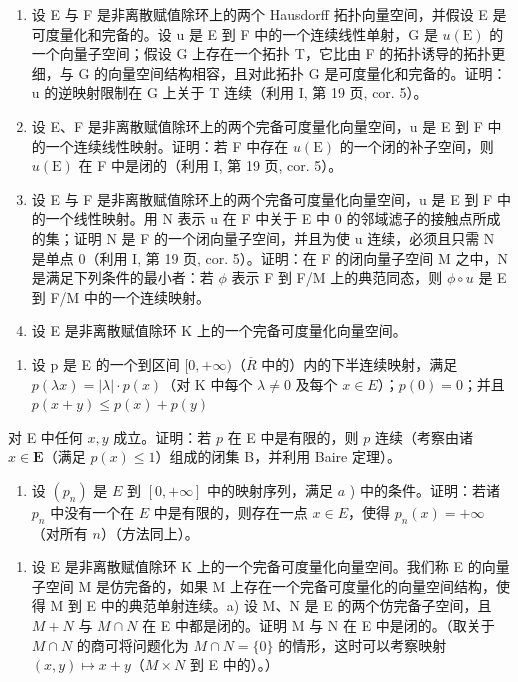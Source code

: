 \begin{enumerate}
\def\labelenumi{\arabic{enumi})}
\setcounter{enumi}{2}
\item
  设 E 与 F 是非离散赋值除环上的两个 Hausdorff 拓扑向量空间，并假设 E 是可度量化和完备的。设 u 是 E 到 F 中的一个连续线性单射，G 是 \(u(\mathrm{E})\) 的一个向量子空间；假设 G 上存在一个拓扑 T，它比由 F 的拓扑诱导的拓扑更细，与 G 的向量空间结构相容，且对此拓扑 G 是可度量化和完备的。证明：u 的逆映射限制在 G 上关于 T 连续（利用 I, 第 19 页, cor. 5）。
\item
  设 E、F 是非离散赋值除环上的两个完备可度量化向量空间，u 是 E 到 F 中的一个连续线性映射。证明：若 F 中存在 \(u(\mathrm{E})\) 的一个闭的补子空间，则 \(u(\mathrm{E})\) 在 F 中是闭的（利用 I, 第 19 页, cor. 5）。
\item
  设 E 与 F 是非离散赋值除环上的两个完备可度量化向量空间，u 是 E 到 F 中的一个线性映射。用 N 表示 u 在 F 中关于 E 中 0 的邻域滤子的接触点所成的集；证明 N 是 F 的一个闭向量子空间，并且为使 u 连续，必须且只需 N 是单点 0（利用 I, 第 19 页, cor. 5）。证明：在 F 的闭向量子空间 M 之中，N 是满足下列条件的最小者：若 \(\phi\) 表示 F 到 F/M 上的典范同态，则 \(\phi \circ u\) 是 E 到 F/M 中的一个连续映射。
\item
  设 E 是非离散赋值除环 K 上的一个完备可度量化向量空间。
\end{enumerate}

\begin{enumerate}
\def\labelenumi{\alph{enumi})}
\tightlist
\item
  设 p 是 E 的一个到区间 \([0, +\infty)\)（\(\overline{R}\) 中的）内的下半连续映射，满足 \(p(\lambda x) = |\lambda| \cdot p(x)\)（对 K 中每个 \(\lambda \neq 0\) 及每个 \(x \in E\)）；\(p(0) = 0\)；并且 \(p(x + y) \leqslant p(x) + p(y)\)
\end{enumerate}

对 E 中任何 \(x, y\) 成立。证明：若 \(p\) 在 E 中是有限的，则 \(p\) 连续（考察由诸 \(x \in \mathbf{E}\)（满足 \(p(x) \leqslant 1\)）组成的闭集 B，并利用 Baire 定理）。

\begin{enumerate}
\def\labelenumi{\alph{enumi})}
\setcounter{enumi}{1}
\tightlist
\item
  设 \((p_n)\) 是 \(E\) 到 \([0, +\infty]\) 中的映射序列，满足 \(a\) ) 中的条件。证明：若诸 \(p_n\) 中没有一个在 \(E\) 中是有限的，则存在一点 \(x \in E\)，使得 \(p_n(x) = +\infty\)（对所有 \(n\)）（方法同上）。
\end{enumerate}

\begin{enumerate}
\def\labelenumi{\arabic{enumi})}
\setcounter{enumi}{6}
\tightlist
\item
  设 E 是非离散赋值除环 K 上的一个完备可度量化向量空间。我们称 E 的向量子空间 M 是仿完备的，如果 M 上存在一个完备可度量化的向量空间结构，使得 M 到 E 中的典范单射连续。a) 设 M、N 是 E 的两个仿完备子空间，且 \(M + N\) 与 \(M \cap N\) 在 E 中都是闭的。证明 M 与 N 在 E 中是闭的。（取关于 \(M \cap N\) 的商可将问题化为 \(M \cap N = \{0\}\) 的情形，这时可以考察映射 \((x, y) \mapsto x + y\)（\(M \times N\) 到 E 中的）。）
\end{enumerate}


